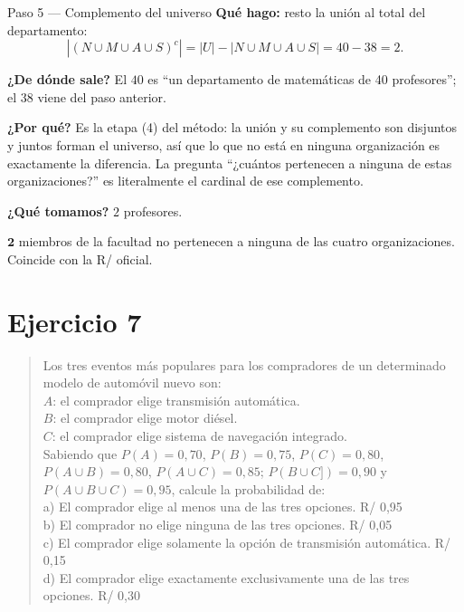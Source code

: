 \documentclass[11pt]{article}
\begin{document}
\begin{paso}{Paso 5 --- Complemento del universo}
\textbf{Qué hago:} resto la unión al total del departamento:
\[
|(N\cup M\cup A\cup S)^{c}| = |U| - |N\cup M\cup A\cup S| = 40-38 = 2 .
\]

\textbf{¿De dónde sale?} El $40$ es ``un departamento de matemáticas de 40 profesores''; el $38$ viene del
paso anterior.

\textbf{¿Por qué?} Es la etapa (4) del método: la unión y su complemento son disjuntos y juntos forman el
universo, así que lo que no está en ninguna organización es exactamente la diferencia. La pregunta
``¿cuántos pertenecen a ninguna de estas organizaciones?'' es literalmente el cardinal de ese complemento.

\textbf{¿Qué tomamos?} $2$ profesores.
\end{paso}

\begin{resp}
$\mathbf{2}$ miembros de la facultad no pertenecen a ninguna de las cuatro organizaciones. Coincide con la
R/ oficial.
\end{resp}

\section*{Ejercicio 7}

\begin{quote}
Los tres eventos más populares para los compradores de un determinado modelo de automóvil nuevo son:\\
$A$: el comprador elige transmisión automática.\\
$B$: el comprador elige motor diésel.\\
$C$: el comprador elige sistema de navegación integrado.\\
Sabiendo que $P(A) = 0{,}70$, $P(B) = 0{,}75$, $P(C) = 0{,}80$, $P(A\cup B) = 0{,}80$,
$P(A\cup C) = 0{,}85$; $P(B\cup C]) = 0{,}90$ y $P(A\cup B\cup C) = 0{,}95$, calcule la probabilidad de:\\
a) El comprador elige al menos una de las tres opciones. \hfill R/ 0,95\\
b) El comprador no elige ninguna de las tres opciones. \hfill R/ 0,05\\
c) El comprador elige solamente la opción de transmisión automática. \hfill R/ 0,15\\
d) El comprador elige exactamente exclusivamente una de las tres opciones. \hfill R/ 0,30
\end{quote}
\end{document}
